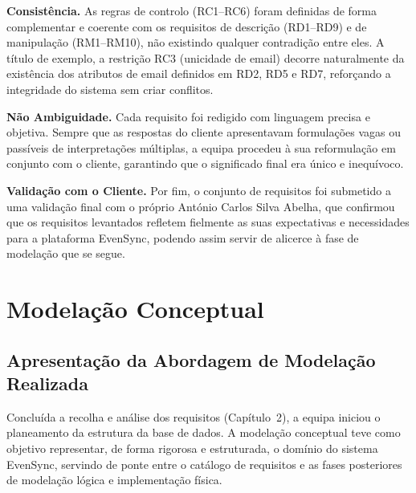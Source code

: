\documentclass[runningheads]{llncs}
\begin{document}
                \textbf{Consistência.} As regras de controlo (RC1--RC6) foram definidas de forma complementar
                e coerente com os requisitos de descrição (RD1--RD9) e de manipulação (RM1--RM10), não existindo
                qualquer contradição entre eles. A título de exemplo, a restrição RC3 (unicidade de email)
                decorre naturalmente da existência dos atributos de email definidos em RD2, RD5 e RD7,
                reforçando a integridade do sistema sem criar conflitos.

                \vspace{0.2cm}

                \textbf{Não Ambiguidade.} Cada requisito foi redigido com linguagem precisa e objetiva.
                Sempre que as respostas do cliente apresentavam formulações vagas ou passíveis de
                interpretações múltiplas, a equipa procedeu à sua reformulação em conjunto com o cliente,
                garantindo que o significado final era único e inequívoco.

                \vspace{0.2cm}

                \textbf{Validação com o Cliente.} Por fim, o conjunto de requisitos foi submetido a uma
                validação final com o próprio António Carlos Silva Abelha, que confirmou que os requisitos levantados
                refletem fielmente as suas expectativas e necessidades para a plataforma EvenSync,
                podendo assim servir de alicerce à fase de modelação que se segue.

        \newpage
        \section{Modelação Conceptual}
                \subsection{Apresentação da Abordagem de Modelação Realizada}

                Concluída a recolha e análise dos requisitos (Capítulo~2), a equipa iniciou o planeamento
                da estrutura da base de dados. A modelação conceptual teve como objetivo representar, de
                forma rigorosa e estruturada, o domínio do sistema EvenSync, servindo de ponte entre o
                catálogo de requisitos e as fases posteriores de modelação lógica e implementação física.
\end{document}
